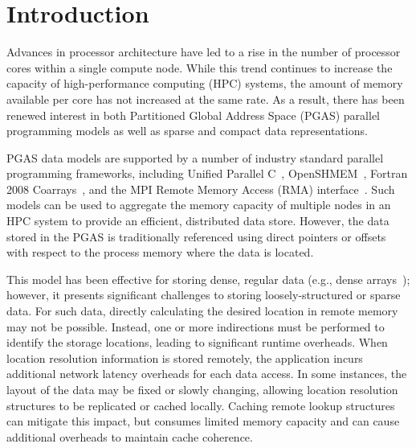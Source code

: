 \section{Introduction}

Advances in processor architecture have led to a rise in the number of
processor cores within a single compute node.  While this trend continues to
increase the capacity of high-performance computing (HPC)
systems, the amount of memory available per core has not increased at the same
rate.  As a result, there has been renewed interest in both Partitioned Global
Address Space (PGAS) parallel programming models as well as sparse and compact
data representations.

PGAS data models are supported by a number of industry standard parallel
programming frameworks, including Unified Parallel C~\cite{upc-13-spec},
OpenSHMEM~\cite{openshmem-1.3}, Fortran 2008 Coarrays~\cite{reid:08}, and the MPI
Remote Memory Access (RMA) interface~\cite{mpi-forum:15}.  Such models can be used
to aggregate the memory capacity of multiple nodes in an HPC system to provide
an efficient, distributed data store.  However, the data stored in the PGAS is
traditionally referenced using direct pointers or offsets with respect to the
process memory where the data is located.

This model has been effective for storing dense, regular data (e.g.,
dense arrays~\cite{ga}); however, it presents significant challenges
to storing loosely-structured or sparse data.  For such data, directly
calculating the desired location in remote memory may not be possible.
Instead, one or more indirections must be performed to identify the
storage locations, leading to significant runtime overheads.  When
location resolution information is stored remotely, the application
incurs additional network latency overheads for each data access. In
some instances, the layout of the data may be fixed or slowly
changing, allowing location resolution structures to be replicated or
cached locally. Caching remote lookup structures can mitigate this
impact, but consumes limited memory capacity and can cause additional
overheads to maintain cache coherence.


